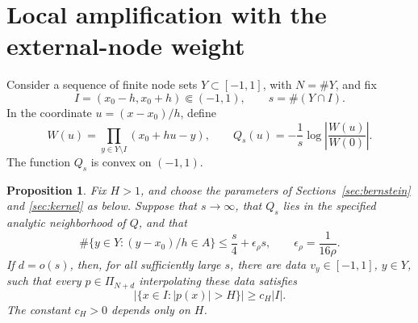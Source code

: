 \documentclass[11pt]{article}
\newtheorem{proposition}[theorem]{Proposition}
\theoremstyle{definition}
\numberwithin{equation}{section}
\begin{document}
\section{Local amplification with the external-node weight}
\label{sec:weighted}

Consider a sequence of finite node sets \(Y\subset[-1,1]\),
with \(N=\#Y\), and fix
\[
 I=(x_0-h,x_0+h)\Subset(-1,1),
 \qquad s=\#(Y\cap I).
\]
In the coordinate \(u=(x-x_0)/h\), define
\begin{equation}\label{eq:actual-field}
 W(u)=\prod_{y\in Y\setminus I}(x_0+hu-y),
 \qquad
 Q_s(u)=-\frac1s\log\left|\frac{W(u)}{W(0)}\right|.
\end{equation}
The function \(Q_s\) is convex on \((-1,1)\).

\begin{proposition}\label{prop:weighted}
Fix \(H>1\), and choose the parameters of
Sections~\ref{sec:bernstein} and \ref{sec:kernel} as below.
Suppose that \(s\to\infty\), that \(Q_s\) lies in the specified
analytic neighborhood of \(Q\), and that
\begin{equation}\label{eq:central-count}
 \#\{y\in Y:(y-x_0)/h\in A\}
 \le \frac{s}{4}+\epsilon_\rho s,
 \qquad \epsilon_\rho=\frac1{16\rho}.
\end{equation}
If \(d=o(s)\), then, for all sufficiently large \(s\), there are
data \(v_y\in[-1,1]\), \(y\in Y\), such that every
\(p\in\Pi_{N+d}\) interpolating these data satisfies
\begin{equation}\label{eq:local-amplification}
 |\{x\in I:|p(x)|>H\}|\ge c_H|I|.
\end{equation}
The constant \(c_H>0\) depends only on \(H\).
\end{proposition}
\end{document}
